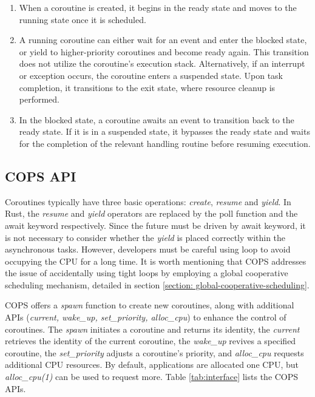 \documentclass[conference]{IEEEtran}
\begin{document}
\begin{enumerate}[leftmargin=*]
    \item When a coroutine is created, it begins in the ready state and moves to the running state once it is scheduled.
    \item A running coroutine can either wait for an event and enter the blocked state, or yield to higher-priority coroutines and become ready again. This transition does not utilize the coroutine's execution stack. Alternatively, if an interrupt or exception occurs, the coroutine enters a suspended state. Upon task completion, it transitions to the exit state, where resource cleanup is performed.
    \item In the blocked state, a coroutine awaits an event to transition back to the ready state. If it is in a suspended state, it bypasses the ready state and waits for the completion of the relevant handling routine before resuming execution.
\end{enumerate}

\subsection{COPS API}
\label{section: cops api}

Coroutines typically have three basic operations: \textit{create}, \textit{resume} and \textit{yield}. In Rust, the \textit{resume} and \textit{yield} operators are replaced by the poll function and the await keyword respectively.
Since the future must be driven by await keyword, it is not necessary to consider whether the \textit{yield} is placed correctly within the asynchronous tasks. However, developers must be careful using loop to avoid occupying the CPU for a long time. It is worth mentioning that COPS addresses the issue of accidentally using tight loops by employing a global cooperative scheduling mechanism, detailed in section \ref{section: global-cooperative-scheduling}.

COPS offers a \textit{spawn} function to create new coroutines, along with additional APIs (\textit{current, wake\_up, set\_priority, alloc\_cpu}) to enhance the control of coroutines. The \textit{spawn} initiates a coroutine and returns its identity, the \textit{current} retrieves the identity of the current coroutine, the \textit{wake\_up} revives a specified coroutine, the \textit{set\_priority} adjusts a coroutine's priority, and \textit{alloc\_cpu} requests additional CPU resources. By default, applications are allocated one CPU, but \textit{alloc\_cpu(1)} can be used to request more. Table \ref{tab:interface} lists the COPS APIs.
\end{document}
